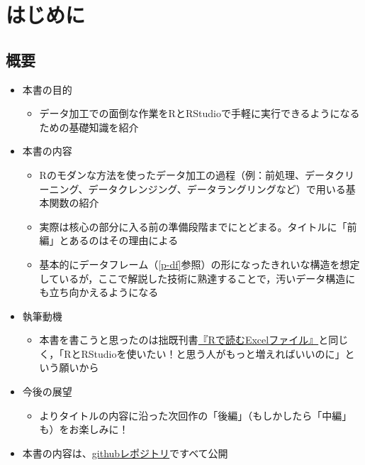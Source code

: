 \documentclass[
  xelatex,ja=standard, b5paper]{bxjsbook}
\author{}
\date{\vspace{-2.5em}}
\providecommand{\tightlist}{%
  \setlength{\itemsep}{0pt}\setlength{\parskip}{0pt}}
\begin{document}
{
\setcounter{tocdepth}{1}
\tableofcontents
}
\hypertarget{hajimeni}{%
\chapter*{はじめに}\label{hajimeni}}

\hypertarget{ux6982ux8981}{%
\section*{概要}\label{ux6982ux8981}}

\begin{itemize}
\tightlist
\item
  本書の目的

  \begin{itemize}
  \tightlist
  \item
    データ加工での面倒な作業をRとRStudioで手軽に実行できるようになるための基礎知識を紹介
  \end{itemize}
\item
  本書の内容

  \begin{itemize}
  \tightlist
  \item
    Rのモダンな方法を使ったデータ加工の過程（例：前処理、データクリーニング、データクレンジング、データラングリングなど）で用いる基本関数の紹介
  \item
    実際は核心の部分に入る前の準備段階までにとどまる。タイトルに「前編」とあるのはその理由による
  \item
    基本的にデータフレーム（\ref{p-df}参照）の形になったきれいな構造を想定しているが，ここで解説した技術に熟達することで，汚いデータ構造にも立ち向かえるようになる
  \end{itemize}
\item
  執筆動機

  \begin{itemize}
  \tightlist
  \item
    本書を書こうと思ったのは拙既刊書\href{https://techbookfest.org/product/4794168259903488?productVariantID=5913872206659584}{『Rで読むExcelファイル』}と同じく，「RとRStudioを使いたい！と思う人がもっと増えればいいのに」という願いから
  \end{itemize}
\item
  今後の展望

  \begin{itemize}
  \tightlist
  \item
    よりタイトルの内容に沿った次回作の「後編」（もしかしたら「中編」も）をお楽しみに！
  \end{itemize}
\item
  本書の内容は、\href{https://github.com/izunyan/gisho12}{githubレポジトリ}ですべて公開
\end{itemize}
\end{document}
